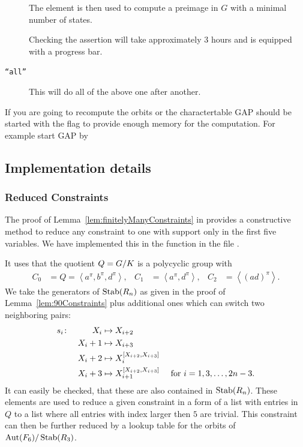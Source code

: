 \documentclass[a4paper,11pt]{amsart}
\begin{document}
\begin{description}
		      The element is then used to compute a preimage in $G$ with a minimal 
		      number of states.

		      Checking the assertion will take approximately $3$ hours and is equipped 
		      with a progress bar. 
  \item [\texttt{``all''}] This will do all of the above one after another.		      
   \end{description}
If you are going to recompute the orbits or the charactertable GAP should be 
started with the  flag
to provide enough memory for the computation. For example start GAP by 


\subsection{Implementation details}
\label{sec:gap_details}
\subsubsection{Reduced Constraints}
The proof of Lemma~\ref{lem:finitelyManyConstraints} in \cite{Lysenok:QudraticEquationsInGrig} 
provides a constructive method to reduce any constraint to one with support
only in the first five variables. 
We have implemented this in the function  in the file
.

It uses that the quotient $Q={G/K}$ is a polycyclic group with 
\begin{align*}
 C_0 &= Q = \left<a^\pi,b^\pi,d^\pi\right>, &
 C_1 &= \left<a^\pi,d^\pi\right>, &
 C_2 &= \left<(ad)^\pi\right>.
\end{align*}
We take the generators of $\operatorname{Stab}(R_n)$ as given in the proof of Lemma~\ref{lem:90Constraints}
plus additional ones which can switch two neighboring pairs:
\begin{align*}
 s_i &\colon &X_i&\mapsto X_{i+2}&\\
	    &&X_i+1&\mapsto X_{i+3}&\\
	    &&X_i+2&\mapsto X_{i}^{[X_{i+2},X_{i+3}]}&\\
	    &&X_i+3&\mapsto X_{i+1}^{[X_{i+2},X_{i+3}]} & \textup{ for }i = 1,3,\dotsc,2n-3.
\end{align*}
It can easily be checked, that these are also contained in $\operatorname{Stab}(R_n)$. These elements
are used to reduce a given constraint in a form of a list with entries in $Q$ to a
list where all entries with index larger then $5$ are trivial. 
This constraint can then be further reduced by a lookup table for the orbits
of ${\operatorname{{Aut}}(F_6)/\operatorname{Stab}(R_3)}$. 
\end{document}
